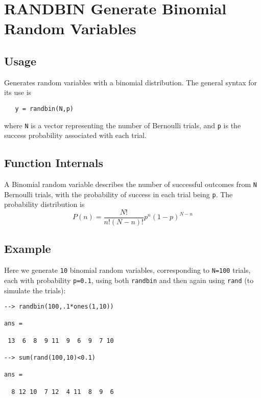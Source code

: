 \section{RANDBIN Generate Binomial Random Variables}

\subsection{Usage}

Generates random variables with a binomial distribution.
The general syntax for its use is
\begin{verbatim}
   y = randbin(N,p)
\end{verbatim}
where \verb|N| is a vector representing the number of Bernoulli
trials, and \verb|p| is the success probability associated with each
trial.
\subsection{Function Internals}

A Binomial random variable describes the number of successful
outcomes from \verb|N| Bernoulli trials, with the probability of
success in each trial being \verb|p|.  The probability distribution
is
\[
   P(n) = \frac{N!}{n!(N-n)!}p^n(1-p)^{N-n}
\]
\subsection{Example}

Here we generate \verb|10| binomial random variables, corresponding
to \verb|N=100| trials, each with probability \verb|p=0.1|, using
both \verb|randbin| and then again using \verb|rand| (to simulate the trials):
\begin{verbatim}
--> randbin(100,.1*ones(1,10))

ans = 

 13  6  8  9 11  9  6  9  7 10 

--> sum(rand(100,10)<0.1)

ans = 

  8 12 10  7 12  4 11  8  9  6 
\end{verbatim}
